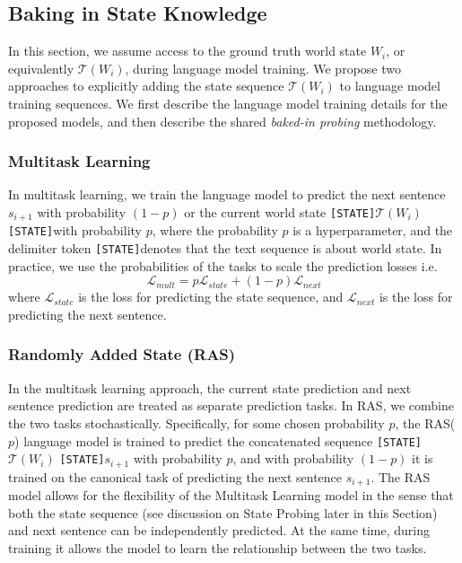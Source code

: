 \documentclass[12pt]{thesis-umich}[thesis]
\newcommand{\state}[0]{\texttt{[STATE]}}
\begin{document}
\subsection{Baking in State Knowledge}
\label{sec:baked_probing}
In this section, we assume access to the ground truth world state $W_i$, or equivalently $\mathcal{T}(W_i)$, during language model training.
We propose two approaches to explicitly adding the state sequence $\mathcal{T}(W_i)$ to language model training sequences. 
We first describe the language model training details for the proposed models, and then describe the shared \emph{baked-in probing} methodology. 


\subsubsection{Multitask Learning}
\label{sec:multitask}
In multitask learning, we train the language model to predict the next sentence $s_{i+1}$ with probability $(1 - p)$ or the current world state \state $\mathcal{T}(W_i)$ \state with probability $p$, where the probability $p$ is a hyperparameter, and the delimiter  token \state denotes that the text sequence is about world state. In practice, we use the probabilities of the tasks to scale the prediction losses i.e.\ 
$$\mathcal{L}_{{mult}} = p\mathcal{L}_{{state}}  + (1 - p) \mathcal{L}_{next} $$
where $\mathcal{L}_{{state}}$ is the loss for predicting the state sequence, and $\mathcal{L}_{next}$ is the loss for predicting the next sentence. 

\subsubsection{Randomly Added State (RAS)}
\label{sec:ras}
In the multitask learning approach, the current state prediction and next sentence prediction are treated as separate prediction tasks. In RAS, we combine the two tasks stochastically. Specifically, for some chosen probability $p$, the RAS($p$) language model is trained to predict the concatenated sequence \state  $\mathcal{T}(W_i)$ \state  $s_{i+1}$ with probability $p$, and with probability $(1 - p)$ it is trained on the canonical task of predicting the next sentence $s_{i+1}$. 
The RAS model allows for the flexibility of the Multitask Learning model in the sense that both the state sequence (see discussion on State Probing later in this Section) and next sentence can be independently predicted. At the same time, during training it allows the model to learn the relationship between the two tasks.
\end{document}
